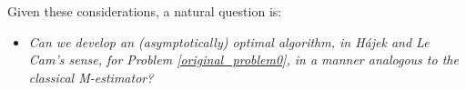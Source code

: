 \documentclass[aos]{imsart}
\numberwithin{equation}{section}
\theoremstyle{plain}
\newcommand{\michael}[1]{\textcolor{red}{Michael:\ #1}}
\newcommand{\yihang}[1]{\textcolor{blue}{Yihang:\ #1}}
\begin{document}
Given these considerations, a natural question is: 
\begin{itemize}
\item \textit{Can we develop an (asymptotically) optimal algorithm, in H\'ajek and Le Cam's sense, for Problem \eqref{original_problem0}, in a manner analogous to the classical M-estimator?}
\end{itemize}
\end{document}
